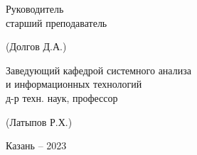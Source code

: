 \begin{titlepage}
\begin{center}
		\vspace{35pt}

		\begin{minipage}{\textwidth}
			\begin{minipage}{0.40\textwidth}
				\begin{singlespace}
				\fontsize{13}{13}\selectfont
				Руководитель \\
				старший преподаватель
				\end{singlespace}
			\end{minipage}
			\begin{minipage}{0.60\textwidth}
				\fontsize{13}{13}\selectfont
				\vspace{\baselineskip}
				\hfill (Долгов Д.А.)
			\end{minipage}
		\end{minipage}
	
		\vspace{32pt}
		
		\begin{minipage}{\textwidth}
			\begin{minipage}{0.60\textwidth}
				\raggedright
				\begin{singlespace}
					\fontsize{13}{15}\selectfont
					Заведующий кафедрой системного анализа \\
					и информационных технологий \\
					д-р техн. наук, профессор
				\end{singlespace}
			\end{minipage}
			\begin{minipage}{0.40\textwidth}
				\fontsize{13}{15}\selectfont
				\vspace{36pt}
				\hfill (Латыпов Р.Х.)
			\end{minipage}
		\end{minipage}
		
		
		
	\end{center}
	
	
	\vfill
	
	\begin{center}
		Казань -- 2023
	\end{center}
	
	
\end{titlepage}
\thispagestyle{empty} %
\setcounter{page}{2} %
